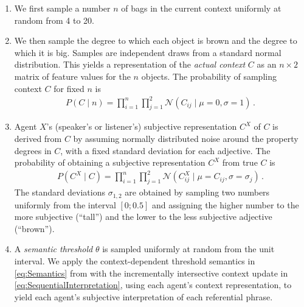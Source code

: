 \documentclass[10pt,a4paper]{article}
\newcommand{\sem}[1]{\mbox{$[\![$#1$]\!]$}}
\newcommand{\gcs}[1]{\textcolor{blue}{[gcs: #1]}}
\begin{document}
\begin{enumerate}
\setlength{\itemsep}{0pt}

\item We first sample a number $n$ of bags in the current context uniformly at
  random from 4 to 20.

\item We then sample the degree to which each object is brown and the
  degree to which it is big. Samples are independent draws
  from a standard normal distribution. This yields a representation of
  the \emph{actual context} $C$ as an $n \times 2$ matrix of feature values for
  the $n$ objects. The probability of sampling context $C$ for fixed $n$ is
  \begin{align*}
    P(C \mid n) = \prod_{i=1}^n \prod_{j=1}^2 \mathcal{N}(C_{ij} \mid \mu = 0, \sigma = 1)\,.
  \end{align*}

\item Agent $X$'s (speaker's or listener's) subjective representation $C^X$ of
  $C$ is derived from $C$ by assuming normally distributed noise around the
  property degrees in $C$, with a fixed standard deviation for each adjective.
  The probability of obtaining a subjective representation $C^X$ from true $C$ is
  \begin{align*}
    P(C^X \mid C) = \prod_{i=1}^n \prod_{j=1}^2 \mathcal{N}(C_{ij}^X \mid \mu = C_{ij}, \sigma = \sigma_j)\,.
  \end{align*}
  The standard deviations $\sigma_{1,2}$ are obtained by sampling two numbers
  uniformly from the interval $[0;0.5]$ and assigning the higher number to the
  more subjective (``tall'') and the lower to the less subjective
  adjective (``brown'').

\item A \emph{semantic threshold} $\theta$ is sampled
  uniformly at random from the unit interval. We apply the context-dependent
  threshold semantics in \eqref{eq:Semantics} from  with
  the incrementally intersective context update in
  \eqref{eq:SequentialInterpretation}, using each agent's context
  representation, to yield each agent's subjective interpretation of each
  referential phrase.
 

\end{enumerate}
\end{document}
